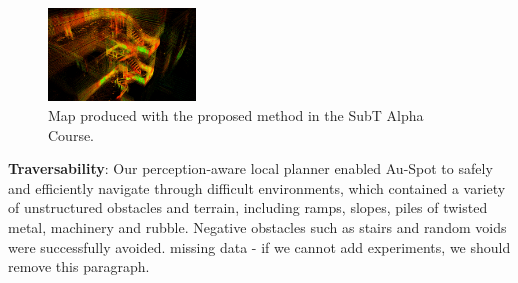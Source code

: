 \documentclass[letterpaper, 10pt, conference]{ieeeconf}      %
\newcommand{\ph}[1]{{\textbf{#1}:}} %
\newcommand{\rev}[1]{{\color{blue}#1}} %
\begin{document}
\begin{figure}[t!]  %
  \centering
  \includegraphics[width=0.35\textwidth]{graphics/spot_alpha_course_stairs.PNG}
  \caption{\rev{Map produced with the proposed method in the SubT Alpha Course.}}
  \label{fig:alpha_course_stairs_map}
\end{figure}




\ph{Traversability}
Our perception-aware local planner enabled Au-Spot to safely and efficiently navigate through difficult environments, which contained a variety of unstructured obstacles and terrain, including ramps, slopes, piles of twisted metal, machinery and rubble.  Negative obstacles such as stairs and random voids were successfully avoided. {\color{red} missing data - if we cannot add experiments, we should remove this paragraph.}
\end{document}

